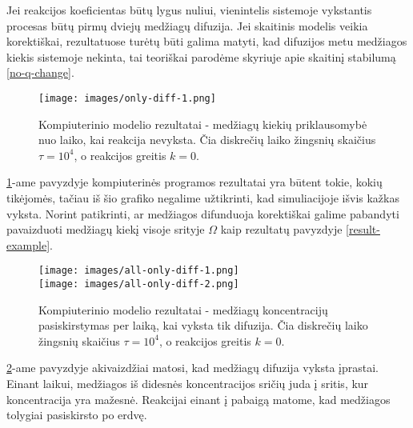 Jei reakcijos koeficientas būtų lygus nuliui, vienintelis sistemoje vykstantis procesas būtų pirmų dviejų medžiagų difuzija. Jei skaitinis modelis veikia korektiškai, rezultatuose turėtų būti galima matyti, kad difuzijos metu medžiagos kiekis sistemoje nekinta, tai teoriškai parodėme skyriuje apie skaitinį stabilumą \eqref{no-q-change}.

\begin{figure}[h!]
    \centering
    \texttt{[image: images/only-diff-1.png]}
    \caption{Kompiuterinio modelio rezultatai - medžiagų kiekių priklausomybė nuo laiko, kai reakcija nevyksta. Čia diskrečių laiko žingsnių skaičius $\tau=10^4$, o reakcijos greitis $k = 0$. }
    \label{no-reaction}
\end{figure}

\ref{no-reaction}-ame pavyzdyje kompiuterinės programos rezultatai yra būtent tokie, kokių tikėjomės, tačiau iš šio grafiko negalime užtikrinti, kad simuliacijoje išvis kažkas vyksta. Norint patikrinti, ar medžiagos difunduoja korektiškai galime pabandyti pavaizduoti medžiagų kiekį visoje srityje $\Omega$ kaip rezultatų pavyzdyje \eqref{result-example}.

\begin{figure}[h!]
\centering
\texttt{[image: images/all-only-diff-1.png]} \\
\texttt{[image: images/all-only-diff-2.png]}

\caption{Kompiuterinio modelio rezultatai - medžiagų koncentracijų pasiskirstymas per laiką, kai vyksta tik difuzija. Čia diskrečių laiko žingsnių skaičius $\tau=10^4$, o reakcijos greitis $k = 0$. }

\label{only-diffusion}
\end{figure}

\ref{only-diffusion}-ame pavyzdyje akivaizdžiai matosi, kad medžiagų difuzija vyksta įprastai. Einant laikui, medžiagos iš didesnės koncentracijos sričių juda į sritis, kur koncentracija yra mažesnė. Reakcijai einant į pabaigą matome, kad medžiagos tolygiai pasiskirsto po erdvę.


